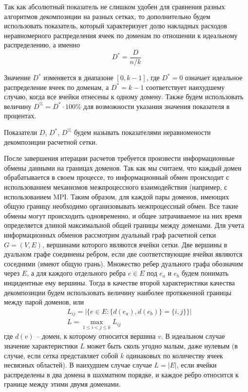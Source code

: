 Так как абсолютный показатель не слишком удобен для сравнения разных алгоритмов декомпозиции на разных сетках, то дополнительно будем использовать показатель, который характеризует долю накладных расходов неравномерного распределения ячеек по доменам по отношении к идеальному распределению, а именно
\begin{equation}
	D^{*} = \frac{D}{n / k}
\end{equation}

Значение $D^{*}$ изменяется в диапазоне $[0, k - 1]$, где $D^{*} = 0$ означает идеальное распределение ячеек по доменам, а $D^{*} = k - 1$ соответствует наихудшему случаю, когда все ячейки отнесены к одному домену.
Также будем использовать величину $D^{\%} = D^{*} \cdot 100\%$ для возможности указания значения показателя в процентах.

\begin{definition}
Показатели $D$, $D^{*}$, $D^{\%}$ будем называть показателями неравномености декомпозиции расчетной сетки.
\end{definition} 

После завершения итерации расчетов требуется произвести информационные обмены данными на границах доменов.
Так как мы считаем, что каждый домен обрабатывается в своем процессе, то информационный обмен происходит с использованием механизмов межпроцессного взаимодействия (например, с использованием MPI.
Таким образом, для каждой пары доменов, имеющих общую границу необходимо организовывать межпроцессный обмен.
Все такие обмены могут происходить одновременно, и общее затрачиваемое на них время определяется длиной максимальной общей границы между доменами.
Для учета информационных обменов рассмотрим дуальный граф расчетной сетки $G = (V, E)$, вершинами которого являются ячейки сетки.
Две вершины в дуальном графе соединены ребром, если две соответствующие ячейки являются соседними (имеют общую грань).
Множество ребер дуального графа обозначим через $E$, а для каждого отдельного ребра $e \in E$ под $e_a$ и $e_b$ будем понимать инцидентные ему вершины.
Тогда в качестве второй характеристики качества декомпозиции будем использовать величину наиболее протяженной границы между парой доменов, или
\begin{equation}
	\begin{aligned}
		& L_{ij} = \left| \{ e \in E: \{ d(e_a), d(e_b) \} = \{ i, j \} \} \right| \\
		& L = \max_{1 \le i < j \le k}{L_{ij}}
	\end{aligned}
\end{equation}
где $d(v)$ -- домен, к которому относится вершина $v$.
В идеальном случае значение характеристики $L$ может быть сколь угодно малым, даже нулевым (в случае, если сетка представляет собой $k$ одинаковых по количеству ячеек несвязных областей).
В наихудшем случае случае $L = |E|$, если ячейки распределены в два домена в шахматном порядке, и каждое ребро относится к границе между этими двумя доменами.

